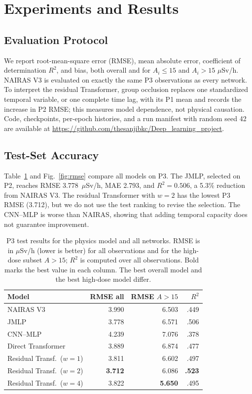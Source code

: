 \documentclass[10pt,twocolumn,letterpaper]{article}
\begin{document}
\section{Experiments and Results}
\label{sec:experiments}

\subsection{Evaluation Protocol}
We report root-mean-square error (RMSE), mean absolute error, coefficient of
determination $R^2$, and bias, both overall and for $A_i\leq15$ and $A_i>15$
$\mu$Sv/h. NAIRAS V3 is evaluated on exactly the same P3 observations as every
network. To interpret the residual Transformer, group occlusion replaces one
standardized temporal variable, or one complete time lag, with its P1 mean and
records the increase in P2 RMSE; this measures model dependence, not physical
causation. Code, checkpoints, per-epoch histories, and a run manifest with
random seed 42 are available at
\url{https://github.com/thesanjibkc/Deep_learning_project}.

\subsection{Test-Set Accuracy}
Table~\ref{tab:results} and Fig.~\ref{fig:rmse} compare all models on P3.
The JMLP, selected on P2, reaches RMSE 3.778~$\mu$Sv/h, MAE 2.793, and
$R^2=0.506$, a 5.3\% reduction from NAIRAS V3. The residual Transformer with
$w=2$ has the lowest P3 RMSE (3.712), but we do not use the test ranking to
revise the selection. The CNN--MLP is worse than NAIRAS, showing that adding
temporal capacity does not guarantee improvement.

\begin{table}[t]
\caption{P3 test results for the physics model and all networks. RMSE is in
$\mu$Sv/h (lower is better) for all observations and for the high-dose subset
$A>15$; $R^2$ is computed over all observations. Bold marks the best value in
each column. The best overall model and the best high-dose model differ.}
\label{tab:results}
\centering\small
\begin{tabular}{lrrr}\toprule
Model & RMSE all & RMSE $A>15$ & $R^2$ \\ \midrule
NAIRAS V3 & 3.990 & 6.503 & .449 \\
JMLP & 3.778 & 6.571 & .506 \\
CNN--MLP & 4.239 & 7.076 & .378 \\
Direct Transformer & 3.889 & 6.874 & .477 \\
Residual Transf.\ ($w=1$) & 3.811 & 6.602 & .497 \\
Residual Transf.\ ($w=2$) & \textbf{3.712} & 6.086 & \textbf{.523} \\
Residual Transf.\ ($w=4$) & 3.822 & \textbf{5.650} & .495 \\ \bottomrule
\end{tabular}
\end{table}
\end{document}
